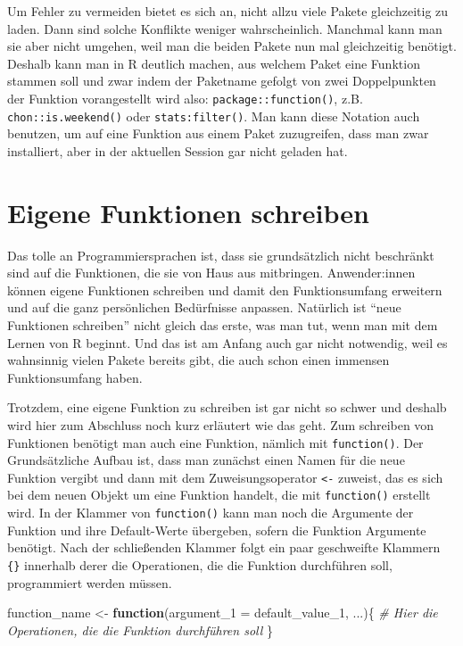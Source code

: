 \documentclass[
]{book}
\newenvironment{Shaded}{\begin{snugshade}}{\end{snugshade}}
\newcommand{\AttributeTok}[1]{\textcolor[rgb]{0.77,0.63,0.00}{#1}}
\newcommand{\CommentTok}[1]{\textcolor[rgb]{0.56,0.35,0.01}{\textit{#1}}}
\newcommand{\ControlFlowTok}[1]{\textcolor[rgb]{0.13,0.29,0.53}{\textbf{#1}}}
\newcommand{\NormalTok}[1]{#1}
\newcommand{\OtherTok}[1]{\textcolor[rgb]{0.56,0.35,0.01}{#1}}
\begin{document}
Um Fehler zu vermeiden bietet es sich an, nicht allzu viele Pakete gleichzeitig zu laden. Dann sind solche Konflikte weniger wahrscheinlich. Manchmal kann man sie aber nicht umgehen, weil man die beiden Pakete nun mal gleichzeitig benötigt. Deshalb kann man in R deutlich machen, aus welchem Paket eine Funktion stammen soll und zwar indem der Paketname gefolgt von zwei Doppelpunkten der Funktion vorangestellt wird also: \texttt{package::function()}, z.B. \texttt{chon::is.weekend()} oder \texttt{stats:filter()}. Man kann diese Notation auch benutzen, um auf eine Funktion aus einem Paket zuzugreifen, dass man zwar installiert, aber in der aktuellen Session gar nicht geladen hat.

\hypertarget{eigene-funktionen-schreiben}{%
\section{Eigene Funktionen schreiben}\label{eigene-funktionen-schreiben}}

Das tolle an Programmiersprachen ist, dass sie grundsätzlich nicht beschränkt sind auf die Funktionen, die sie von Haus aus mitbringen. Anwender:innen können eigene Funktionen schreiben und damit den Funktionsumfang erweitern und auf die ganz persönlichen Bedürfnisse anpassen. Natürlich ist ``neue Funktionen schreiben'' nicht gleich das erste, was man tut, wenn man mit dem Lernen von R beginnt. Und das ist am Anfang auch gar nicht notwendig, weil es wahnsinnig vielen Pakete bereits gibt, die auch schon einen immensen Funktionsumfang haben.

Trotzdem, eine eigene Funktion zu schreiben ist gar nicht so schwer und deshalb wird hier zum Abschluss noch kurz erläutert wie das geht. Zum schreiben von Funktionen benötigt man auch eine Funktion, nämlich mit \texttt{function()}. Der Grundsätzliche Aufbau ist, dass man zunächst einen Namen für die neue Funktion vergibt und dann mit dem Zuweisungsoperator \texttt{\textless{}-} zuweist, das es sich bei dem neuen Objekt um eine Funktion handelt, die mit \texttt{function()} erstellt wird. In der Klammer von \texttt{function()} kann man noch die Argumente der Funktion und ihre Default-Werte übergeben, sofern die Funktion Argumente benötigt. Nach der schließenden Klammer folgt ein paar geschweifte Klammern \texttt{\{\}} innerhalb derer die Operationen, die die Funktion durchführen soll, programmiert werden müssen.

\begin{Shaded}
\begin{Highlighting}[]
\NormalTok{function\_name }\OtherTok{\textless{}{-}} \ControlFlowTok{function}\NormalTok{(}\AttributeTok{argument\_1 =}\NormalTok{ default\_value\_1, ...)\{}
  \CommentTok{\# Hier die Operationen, die die Funktion durchführen soll}
\NormalTok{  \}}
\end{Highlighting}
\end{Shaded}
\end{document}
